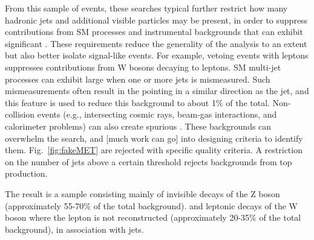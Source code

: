 \begin{marginnote}[]
\end{marginnote}


From this sample of events, these searches typical further restrict how many hadronic jets and additional visible particles may be present, in order to suppress contributions from SM processes and instrumental backgrounds that can exhibit significant \MET. These requirements reduce the generality of the analysis to an extent but also better isolate signal-like events.
For example, vetoing events with leptons suppresses contributions from W bosons decaying to leptons. 
SM multi-jet processes can exhibit large \MET when one or more jets is mismeasured. Such mismeasurements often result in the \MET pointing in a similar direction as the jet, and this feature is used to reduce this background to about 1\% of the total.
Non-collision events (e.g., intersecting cosmic rays, beam-gas interactions, and calorimeter problems) can also create spurious \MET.
These backgrounds can overwhelm the search, and [much work can go] into designing criteria to identify them. 
Fig.~\ref{fig:fakeMET} are rejected with specific quality criteria.%
A restriction on the number of jets above a certain threshold rejects backgrounds from top production. 

The result is a sample consisting mainly of invisible decays of the Z boson (approximately 55-70\% of the total background).
and leptonic decays of the W boson where the lepton is not
reconstructed (approximately 20-35\% of the total background), in association with jets.

